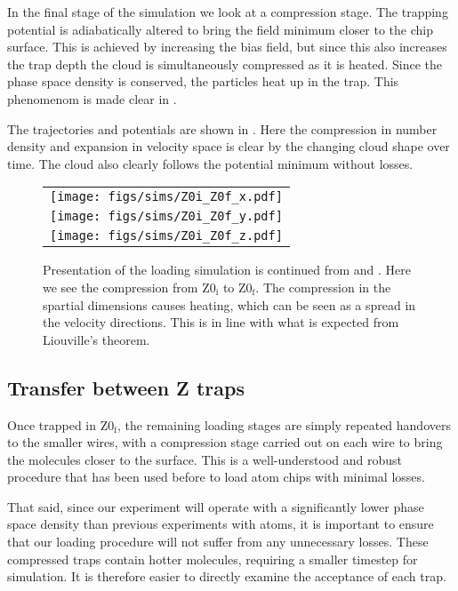 In the final stage of the simulation we look at a compression stage. The
trapping potential is adiabatically altered to bring the field minimum closer
to the chip surface. This is achieved by increasing the bias field, but since
this also increases the trap depth the cloud is simultaneously compressed as it
is heated. Since the phase space density is conserved, the particles heat up in
the trap. This phenomenom is made clear in .

The trajectories and potentials are shown in .
Here the compression in number density and expansion in velocity space is clear
by the changing cloud shape over time. The cloud also clearly follows the
potential minimum without losses.

\begin{figure}[p]
\centering
  \begin{tabular}{c}
    \texttt{[image: figs/sims/Z0i\_Z0f\_x.pdf]} \\
    \texttt{[image: figs/sims/Z0i\_Z0f\_y.pdf]} \\
    \texttt{[image: figs/sims/Z0i\_Z0f\_z.pdf]}
  \end{tabular}
  \caption{Presentation of the loading simulation is continued from
   and . Here we see
  the compression from $\mathrm{Z0_i}$ to $\mathrm{Z0_f}$. The compression in
  the spartial dimensions causes heating, which can be seen as a spread in the
  velocity directions. This is in line with what is expected from Liouville's
  theorem.
  }
  \label{design:fig:Z0i_Z0f}
\end{figure}

\subsection{Transfer between Z traps}
\label{design:transferbetweenzs}

Once trapped in $\mathrm{Z0_f}$, the remaining loading stages are simply
repeated handovers to the smaller wires, with a compression stage carried out
on each wire to bring the molecules closer to the surface. This is a
well-understood and robust procedure that has been used before to load atom
chips with minimal losses.~\cite{Reichel2002}

That said, since our experiment will operate with a significantly lower phase
space density than previous experiments with atoms, it is important to ensure
that our loading procedure will not suffer from any unnecessary losses. These
compressed traps contain hotter molecules, requiring a smaller timestep for
simulation. It is therefore easier to directly examine the acceptance of each
trap.

